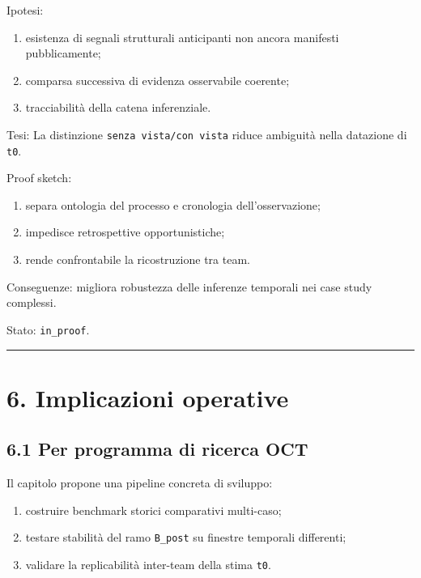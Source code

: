 Ipotesi:

\begin{enumerate}
\def\labelenumi{\arabic{enumi}.}
\tightlist
\item
  esistenza di segnali strutturali anticipanti non ancora manifesti pubblicamente;
\item
  comparsa successiva di evidenza osservabile coerente;
\item
  tracciabilità della catena inferenziale.
\end{enumerate}

Tesi:
La distinzione \texttt{senza\ vista/con\ vista} riduce ambiguità nella datazione di \texttt{t0}.

Proof sketch:

\begin{enumerate}
\def\labelenumi{\arabic{enumi}.}
\tightlist
\item
  separa ontologia del processo e cronologia dell'osservazione;
\item
  impedisce retrospettive opportunistiche;
\item
  rende confrontabile la ricostruzione tra team.
\end{enumerate}

Conseguenze:
migliora robustezza delle inferenze temporali nei case study complessi.

Stato: \texttt{in\_proof}.

\begin{center}\rule{0.5\linewidth}{0.5pt}\end{center}

\section{6. Implicazioni operative}

\subsection{6.1 Per programma di ricerca OCT}

Il capitolo propone una pipeline concreta di sviluppo:

\begin{enumerate}
\def\labelenumi{\arabic{enumi}.}
\tightlist
\item
  costruire benchmark storici comparativi multi-caso;
\item
  testare stabilità del ramo \texttt{B\_post} su finestre temporali differenti;
\item
  validare la replicabilità inter-team della stima \texttt{t0}.
\end{enumerate}

